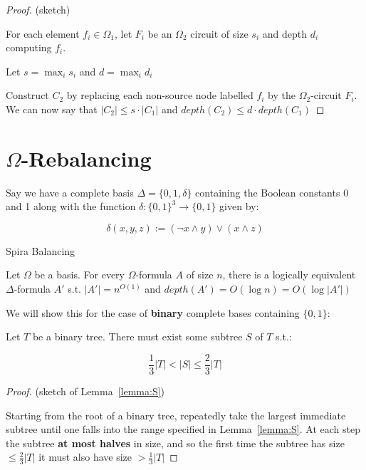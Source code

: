 \documentclass{article}
\begin{document}
\begin{proof}
  (sketch)

  For each element $f_{i} \in \Omega_{1}$, let $F_{i}$ be an \(\Omega_{2}\) circuit of size $s_{i}$ and depth $d_{i}$ computing $f_{i}$.

  Let $s= \max_{i}s_{i}$ and $d=\max_{i}d_{i}$

  Construct $C_{2}$ by replacing each non-source node labelled $f_{i}$ by the \(\Omega_{2}\)-circuit $F_{i}$. We can now say that $|C_{2}| \leq s\cdot |C_{1}|$ and $depth(C_{2})\leq d \cdot depth(C_{1})$
\end{proof}

\section{\(\Omega\)-Rebalancing}

Say we have a complete basis \(\Delta = \{ 0,1,\delta \} \) containing the Boolean constants 0 and 1 along with the function $\delta : \{ 0,1 \}^{3} \rightarrow \{ 0,1 \} $ given by:

\[
  \delta(x,y,z) := (\neg x \wedge y) \vee (x \wedge z)
\]


\begin{theorem}
  Spira Balancing

  Let \(\Omega\) be a basis. For every \(\Omega\)-formula $A$ of size $n$, there is a logically equivalent \(\Delta\)-formula $A'$ s.t. $|A'| = n^{O(1)}$ and $depth(A') = O(\log n) = O(\log |A'|)$
\end{theorem}

We will show this for the case of \textbf{binary} complete bases containing $\{ 0,1 \} $:

\begin{lemma}\label{lemma:S}
  Let $T$ be a binary tree. There must exist some subtree $S$ of $T$ s.t.:

  \[
    \frac{1}{3}|T| < |S| \leq \frac{2}{3}|T|
  \]
\end{lemma}

\begin{proof}

  (sketch of Lemma~\ref{lemma:S})

  Starting from the root of a binary tree, repeatedly take the largest immediate subtree until one falls into the range specified in Lemma~\ref{lemma:S}. At each step the subtree \textbf{at most halves} in size, and so the first time the subtree has size $\leq \frac{2}{3}|T|$ it must also have size $> \frac{1}{3}|T|$

\end{proof}
\end{document}
